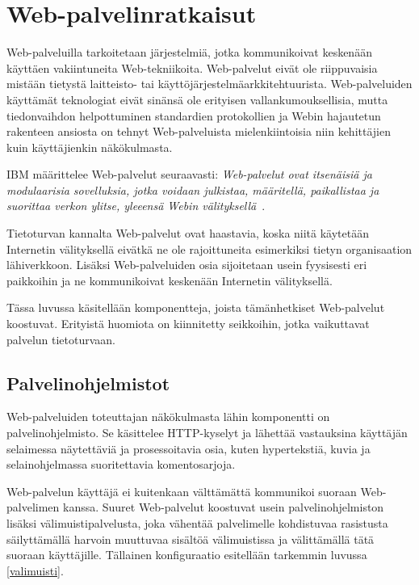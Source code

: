
\chapter{Web-palvelinratkaisut}

Web-palveluilla tarkoitetaan järjestelmiä, jotka kommunikoivat
keskenään käyttäen vakiintuneita Web-tekniikoita. Web-palvelut eivät
ole riippuvaisia mistään tietystä laitteisto- tai
käyttöjärjestelmäarkkitehtuurista. Web-palveluiden käyttämät
teknologiat eivät sinänsä ole erityisen vallankumouksellisia, mutta
tiedonvaihdon helpottuminen standardien protokollien ja Webin
hajautetun rakenteen ansiosta on tehnyt Web-palveluista
mielenkiintoisia niin kehittäjien kuin käyttäjienkin
näkökulmasta\cite{javaweb}.

IBM määrittelee Web-palvelut seuraavasti: \textit{Web-palvelut ovat
itsenäisiä ja modulaarisia sovelluksia, jotka voidaan julkistaa,
määritellä, paikallistaa ja suorittaa verkon ylitse, yleeensä Webin
välityksellä}~\cite{websecurity}.

Tietoturvan kannalta Web-palvelut ovat haastavia, koska niitä
käytetään Internetin välityksellä eivätkä ne ole rajoittuneita
esimerkiksi tietyn organisaation lähiverkkoon.
Lisäksi Web-palveluiden osia sijoitetaan usein fyysisesti eri paikkoihin ja ne
kommunikoivat keskenään Internetin välityksellä.

Tässa luvussa käsitellään komponentteja, joista tämänhetkiset
Web-palvelut koostuvat. Erityistä huomiota on kiinnitetty seikkoihin,
jotka vaikuttavat palvelun tietoturvaan.

\section{Palvelinohjelmistot}

Web-palveluiden toteuttajan näkökulmasta lähin komponentti on
palvelinohjelmisto. Se käsittelee HTTP-kyselyt ja lähettää vastauksina
käyttäjän selaimessa näytettäviä ja prosessoitavia osia, kuten
hypertekstiä, kuvia ja selainohjelmassa suoritettavia komentosarjoja.

Web-palvelun käyttäjä ei kuitenkaan välttämättä kommunikoi suoraan
Web-pal\-ve\-li\-men kanssa. Suuret Web-palvelut koostuvat usein
palvelinohjelmiston lisäksi välimuistipalvelusta, joka vähentää
palvelimelle kohdistuvaa rasistusta säilyttämällä harvoin muuttuvaa
sisältöä välimuistissa ja välittämällä tätä suoraan
käyttäjille. Tällainen konfiguraatio esitellään tarkemmin luvussa \ref{valimuisti}.

